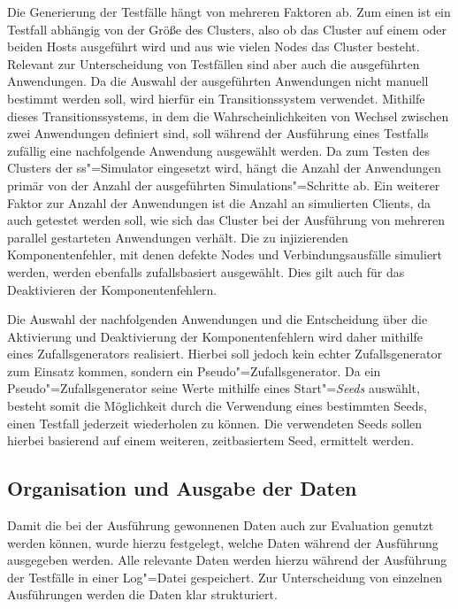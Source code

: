 Die Generierung der Testfälle hängt von mehreren Faktoren ab.
Zum einen ist ein Testfall abhängig von der Größe des Clusters, also ob das Cluster auf einem oder beiden Hosts ausgeführt wird und aus wie vielen Nodes das Cluster besteht.
Relevant zur Unterscheidung von Testfällen sind aber auch die ausgeführten Anwendungen.
Da die Auswahl der ausgeführten Anwendungen nicht manuell bestimmt werden soll, wird hierfür ein Transitionssystem verwendet.
Mithilfe dieses Transitionssystems, in dem die Wahrscheinlichkeiten von Wechsel zwischen zwei Anwendungen definiert sind, soll während der Ausführung eines Testfalls zufällig eine nachfolgende Anwendung ausgewählt werden.
Da zum Testen des Clusters der \ac{ss}"=Simulator eingesetzt wird, hängt die Anzahl der Anwendungen primär von der Anzahl der ausgeführten Simulations"=Schritte ab.
Ein weiterer Faktor zur Anzahl der Anwendungen ist die Anzahl an simulierten Clients, da auch getestet werden soll, wie sich das Cluster bei der Ausführung von mehreren parallel gestarteten Anwendungen verhält.
Die zu injizierenden Komponentenfehler, mit denen defekte Nodes und Verbindungsausfälle simuliert werden, werden ebenfalls zufallsbasiert ausgewählt.
Dies gilt auch für das Deaktivieren der Komponentenfehlern.

Die Auswahl der nachfolgenden Anwendungen und die Entscheidung über die Aktivierung und Deaktivierung der Komponentenfehlern wird daher mithilfe eines Zufallsgenerators realisiert.
Hierbei soll jedoch kein echter Zufallsgenerator zum Einsatz kommen, sondern ein Pseudo"=Zufallsgenerator.
Da ein Pseudo"=Zufallsgenerator seine Werte mithilfe eines Start"=\emph{Seeds} auswählt, besteht somit die Möglichkeit durch die Verwendung eines bestimmten Seeds, einen Testfall jederzeit wiederholen zu können.
Die verwendeten Seeds sollen hierbei basierend auf einem weiteren, zeitbasiertem Seed, ermittelt werden.

\subsection{Organisation und Ausgabe der Daten}
\label{sec:dataOrganisation}

Damit die bei der Ausführung gewonnenen Daten auch zur Evaluation genutzt werden können, wurde hierzu festgelegt, welche Daten während der Ausführung ausgegeben werden.
Alle relevante Daten werden hierzu während der Ausführung der Testfälle in einer Log"=Datei gespeichert.
Zur Unterscheidung von einzelnen Ausführungen werden die Daten klar strukturiert.

